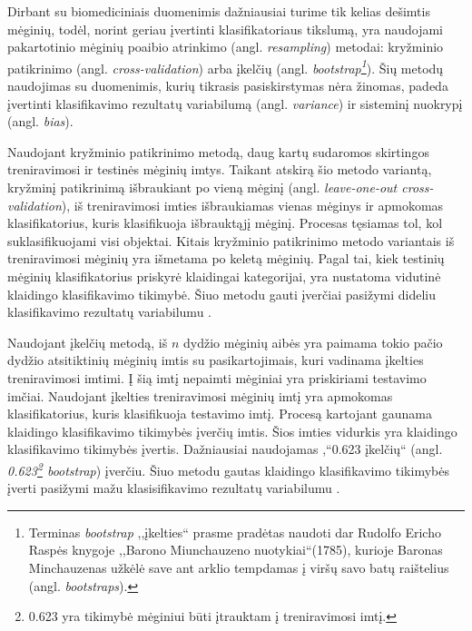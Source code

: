 Dirbant su biomediciniais duomenimis dažniausiai turime tik kelias dešimtis mėginių, todėl, norint geriau įvertinti klasifikatoriaus tikslumą, yra naudojami pakartotinio mėginių poaibio atrinkimo (angl. \textit{resampling}) metodai: kryžminio patikrinimo (angl. \textit{cross-validation}) arba įkelčių (angl. \textit{bootstrap\footnote{Terminas \textit{bootstrap} ,,įkelties`` prasme pradėtas naudoti dar Rudolfo Ericho Raspės knygoje ,,Barono Miunchauzeno nuotykiai``(1785), kurioje Baronas Minchauzenas užkėlė save ant arklio tempdamas į viršų savo batų raištelius (angl. \textit{bootstraps}).}}). Šių metodų naudojimas su duomenimis, kurių tikrasis pasiskirstymas nėra žinomas, padeda įvertinti klasifikavimo rezultatų variabilumą (angl. \textit{variance}) ir sisteminį nuokrypį (angl. \textit{bias}).

Naudojant kryžminio patikrinimo metodą, daug kartų sudaromos skirtingos treniravimosi ir testinės mėginių imtys. Taikant atskirą šio metodo variantą, kryžminį patikrinimą išbraukiant po vieną mėginį (angl. \textit{leave-one-out cross-validation}), iš treniravimosi imties išbraukiamas vienas mėginys ir apmokomas klasifikatorius, kuris klasifikuoja išbrauktąjį mėginį. Procesas tęsiamas tol, kol suklasifikuojami visi objektai. Kitais kryžminio patikrinimo metodo variantais iš treniravimosi mėginių yra išmetama po keletą mėginių. Pagal tai, kiek testinių mėginių klasifikatorius priskyrė klaidingai kategorijai, yra nustatoma vidutinė klaidingo klasifikavimo tikimybė. Šiuo metodu gauti įverčiai pasižymi dideliu klasifikavimo rezultatų variabilumu \cite{braga2004cross}.

Naudojant įkelčių metodą, iš $n$ dydžio mėginių aibės yra paimama tokio pačio dydžio atsitiktinių mėginių imtis su pasikartojimais, kuri vadinama įkelties treniravimosi imtimi. Į šią imtį nepaimti mėginiai yra priskiriami testavimo imčiai. Naudojant įkelties treniravimosi mėginių imtį yra apmokomas klasifikatorius, kuris klasifikuoja testavimo imtį. Procesą kartojant gaunama klaidingo klasifikavimo tikimybės įverčių imtis. Šios imties vidurkis yra klaidingo klasifikavimo tikimybės įvertis. Dažniausiai naudojamas ,“0.623 įkelčių`` (angl. \textit{0.623\footnote{0.623 yra tikimybė mėginiui būti įtrauktam į treniravimosi imtį.} bootstrap}) įverčiu. Šiuo metodu gautas klaidingo klasifikavimo tikimybės įverti pasižymi mažu klasisifikavimo rezultatų variabilumu \cite{michie1994machine}.


